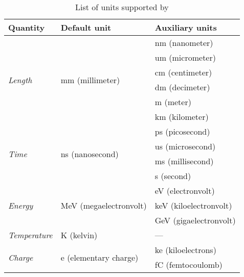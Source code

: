 \begin{table}[tbp]
\caption{List of units supported by \corry}
\label{tab:units}
\centering
\begin{tabular}{lll}
  \toprule
\textbf{Quantity}                 & \textbf{Default unit}                   & \textbf{Auxiliary units} \\
 \midrule
\multirow{6}{*}{\textit{Length}}  & \multirow{6}{*}{mm (millimeter)}        & nm (nanometer)           \\
                                  &                                         & um (micrometer)          \\
                                  &                                         & cm (centimeter)          \\
                                  &                                         & dm (decimeter)           \\
                                  &                                         & m (meter)                \\
                                  &                                         & km (kilometer)           \\
 \midrule
\multirow{4}{*}{\textit{Time}}    & \multirow{4}{*}{ns (nanosecond)}        & ps (picosecond)          \\
                                  &                                         & us (microsecond)         \\
                                  &                                         & ms (millisecond)         \\
                                  &                                         & s (second)               \\
\midrule
\multirow{3}{*}{\textit{Energy}}  & \multirow{3}{*}{MeV (megaelectronvolt)} & eV (electronvolt)        \\
                                  &                                         & keV (kiloelectronvolt)   \\
                                  &                                         & GeV (gigaelectronvolt)   \\
\midrule
\textit{Temperature}              & K (kelvin)                              & ---                      \\
\midrule
\multirow{3}{*}{\textit{Charge}}  & \multirow{3}{*}{e (elementary charge)}  & ke (kiloelectrons)       \\
                                  &                                         & fC (femtocoulomb)        \\

\end{tabular}
\end{table}
